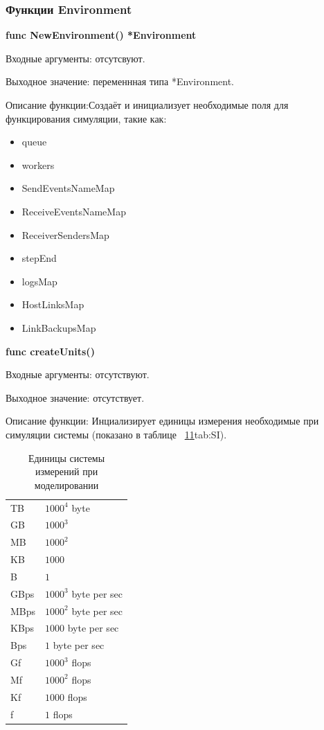 \subsubsection{Функции Environment}
\textbf{func NewEnvironment() *Environment}

Входные аргументы: отсутсвуют.

Выходное значение: переменнная типа *Environment.

Описание функции:Создаёт и инициализует необходимые поля для функцирования симуляции, такие как:
\begin{itemize}
\item 		queue           
\item 		workers        
\item 		SendEventsNameMap 
\item 		ReceiveEventsNameMap
\item 		ReceiverSendersMap
\item 		stepEnd
\item 		logsMap
\item 		HostLinksMap
\item 		LinkBackupsMap
\end{itemize}

\textbf{func createUnits()}

Входные аргументы: отсутствуют.

Выходное значение: отсутствует.

Описание функции: Инциализирует единицы измерения необходимые при симуляции системы (показано в таблице ~\ref{tab:SI}\ref{tab:SI}{tab:SI}).
\begin{table}[]
\centering
\caption{Единицы системы измерений при моделировании}
\label{tab:SI}
\begin{tabularx}{\textwidth}{|X|X|}
TB   & $1000^4$ byte         \\
GB   & $1000^3$              \\
MB   & $1000^2$              \\
KB   & $1000$                \\
B    & $1$                   \\
GBps & $1000^3$ byte per sec \\
MBps & $1000^2$ byte per sec \\
KBps & $1000$ byte per sec   \\
Bps  & $1$ byte per sec      \\
Gf   & $1000^3$ flops        \\
Mf   & $1000^2$ flops        \\
Kf   & $1000$ flops          \\
f    & $1$ flops            
\end{tabularx}
\end{table}

